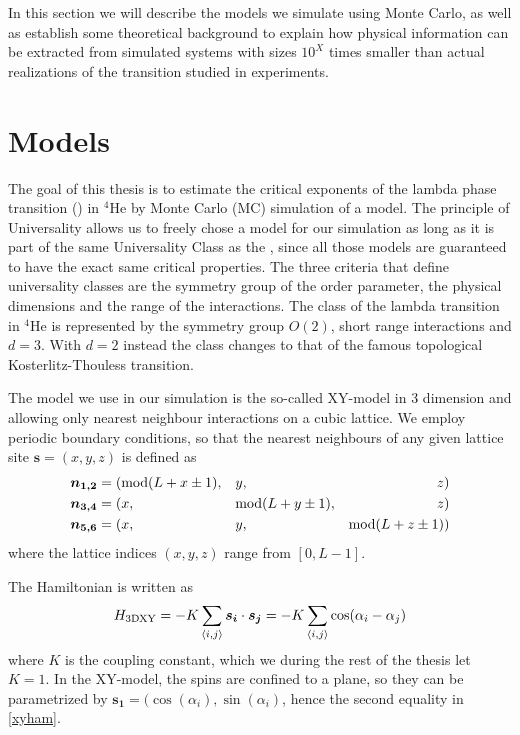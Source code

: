 %
In this section we will describe the models we simulate using Monte Carlo, as well as establish some theoretical background to explain how physical information can be extracted from simulated systems with sizes $10^X$ times smaller than actual realizations of the transition studied in experiments.
\section{Models} %
The goal of this thesis is to estimate the critical exponents of the lambda phase transition (\lpt) in $^4$He by Monte Carlo (MC) simulation of a model. 
The principle of Universality allows us to freely chose a model for our simulation as long as it is part of the same Universality Class as the \lpt, since all those models are guaranteed to have the exact same critical properties. 
The three criteria that define universality classes are the symmetry group of the order parameter, the physical dimensions and the range of the interactions.
The class of the lambda transition in $^4$He is represented by the symmetry group $O(2)$, short range interactions and $d=3$. With $d=2$ instead the class changes to that of the famous topological Kosterlitz-Thouless transition.

The model we use in our simulation is the so-called XY-model in 3 dimension and allowing only nearest neighbour interactions on a cubic lattice.
We employ periodic boundary conditions, so that the nearest neighbours of any given lattice site $\bm{s} = (x,y,z)$ is defined as 
\begin{align}
    \bm{n_{1,2}} &= (\textrm{mod}(L+x\pm1), &   &y,                    &    z)&\\
    \bm{n_{3,4}} &= (x,                  &   &\textrm{mod}(L+y\pm1),   &    z)&\\
    \bm{n_{5,6}} &= (x,                  &   &y,                    &    \textrm{mod}(L+z\pm1))&
\end{align}
where the lattice indices $(x,y,z)$ range from $[0,L-1]$.

The Hamiltonian is written as 
\begin{equation}
  \label{xyham}
  H_{\textrm{3DXY}} = -K\sum\limits_{\langle i,j\rangle} \bm{s_i}\cdot\bm{s_j} = -K\sum\limits_{\langle i,j\rangle} \cos(\alpha_i - \alpha_j)
\end{equation}
where $K$ is the coupling constant, which we during the rest of the thesis let $K=1$.
In the XY-model, the spins are confined to a plane, so they can be parametrized by $ \bm{s_1} = (\cos(\alpha_i),\sin(\alpha_i)$, hence the second equality in \ref{xyham}.

